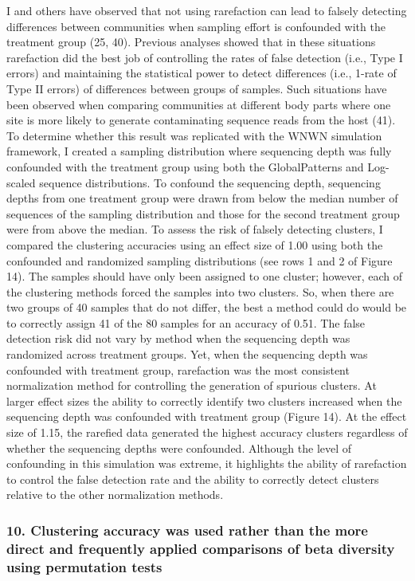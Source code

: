\documentclass[
]{article}
\begin{document}
I and others have observed that not using rarefaction can lead to
falsely detecting differences between communities when sampling effort
is confounded with the treatment group (25, 40). Previous analyses
showed that in these situations rarefaction did the best job of
controlling the rates of false detection (i.e., Type I errors) and
maintaining the statistical power to detect differences (i.e., 1-rate of
Type II errors) of differences between groups of samples. Such
situations have been observed when comparing communities at different
body parts where one site is more likely to generate contaminating
sequence reads from the host (41). To determine whether this result was
replicated with the WNWN simulation framework, I created a sampling
distribution where sequencing depth was fully confounded with the
treatment group using both the GlobalPatterns and Log-scaled sequence
distributions. To confound the sequencing depth, sequencing depths from
one treatment group were drawn from below the median number of sequences
of the sampling distribution and those for the second treatment group
were from above the median. To assess the risk of falsely detecting
clusters, I compared the clustering accuracies using an effect size of
1.00 using both the confounded and randomized sampling distributions
(see rows 1 and 2 of Figure 14). The samples should have only been
assigned to one cluster; however, each of the clustering methods forced
the samples into two clusters. So, when there are two groups of 40
samples that do not differ, the best a method could do would be to
correctly assign 41 of the 80 samples for an accuracy of 0.51. The false
detection risk did not vary by method when the sequencing depth was
randomized across treatment groups. Yet, when the sequencing depth was
confounded with treatment group, rarefaction was the most consistent
normalization method for controlling the generation of spurious
clusters. At larger effect sizes the ability to correctly identify two
clusters increased when the sequencing depth was confounded with
treatment group (Figure 14). At the effect size of 1.15, the rarefied
data generated the highest accuracy clusters regardless of whether the
sequencing depths were confounded. Although the level of confounding in
this simulation was extreme, it highlights the ability of rarefaction to
control the false detection rate and the ability to correctly detect
clusters relative to the other normalization methods.

\hypertarget{clustering-accuracy-was-used-rather-than-the-more-direct-and-frequently-applied-comparisons-of-beta-diversity-using-permutation-tests}{%
\subsubsection{10. Clustering accuracy was used rather than the more
direct and frequently applied comparisons of beta diversity using
permutation
tests}\label{clustering-accuracy-was-used-rather-than-the-more-direct-and-frequently-applied-comparisons-of-beta-diversity-using-permutation-tests}}
\end{document}
